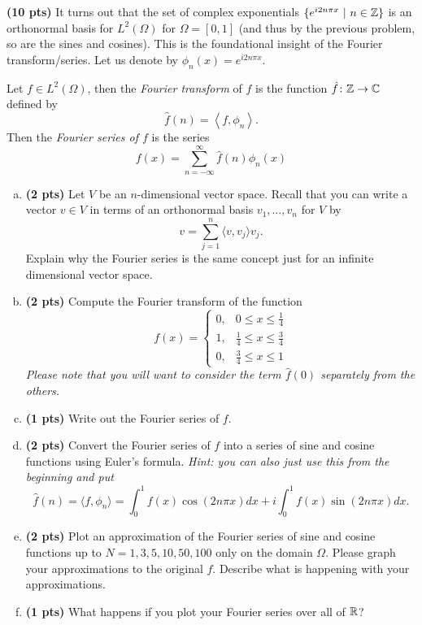 \documentclass[12pt]{article} %
\newcommand{\innprod}[2]{\left\langle #1, #2\right\rangle}
\begin{document}
\begin{problem}
\textbf{(10 pts)} It turns out that the set of complex exponentials $\{e^{i2n\pi x} ~|~ n\in \mathbb{Z}\}$ is an orthonormal basis for $L^2(\Omega)$ for $\Omega = [0,1]$ (and thus by the previous problem, so are the sines and cosines). This is the foundational insight of the Fourier transform/series. Let us denote by $\phi_n(x) = e^{i2n\pi x}$.

Let $f \in L^2(\Omega)$, then the \emph{Fourier transform} of $f$ is the function $\hat{f} \colon \mathbb{Z} \to \mathbb{C}$ defined by
\[
\hat{f}(n) = \innprod{f}{\phi_n}.
\]
Then the \emph{Fourier series of $f$} is the series
\[
f(x) = \sum_{n=-\infty}^\infty \hat{f}(n) \phi_n(x)
\]
\begin{enumerate}[(a)]
\item \textbf{(2 pts)} Let $V$ be an $n$-dimensional vector space. Recall that you can write a vector $v \in V$ in terms of an orthonormal basis $v_1,\dots,v_n$ for $V$ by
\[
v = \sum_{j=1}^n \langle v,v_j\rangle v_j.
\]
Explain why the Fourier series is the same concept just for an infinite dimensional vector space.
\item \textbf{(2 pts)} Compute the Fourier transform of the function 
\[
f(x) = \begin{cases} 0, & 0\leq x \leq \frac{1}{4} \\
	1, &  \frac{1}{4} \leq x \leq \frac{3}{4} \\
 0, & \frac{3}{4}\leq x \leq 1 \end{cases}
\]
\emph{Please note that you will want to consider the term $\hat{f}(0)$ separately from the others.}
\item \textbf{(1 pts)} Write out the Fourier series of $f$. 
\item \textbf{(2 pts)} Convert the Fourier series of $f$ into a series of sine and cosine functions using Euler's formula. \emph{Hint: you can also just use this from the beginning and put}
\[
\hat{f}(n) = \langle f,\phi_n\rangle = \int_0^1 f(x)\cos(2n\pi x) dx + i \int_0^1 f(x)\sin(2n\pi x)dx.
\]
\item \textbf{(2 pts)} Plot an approximation of the Fourier series of sine and cosine functions up to $N=1,3,5,10,50,100$ only on the domain $\Omega$. Please graph your approximations to the original $f$. Describe what is happening with your approximations.
\item \textbf{(1 pts)} What happens if you plot your Fourier series over all of $\mathbb{R}$?
\end{enumerate}
\end{problem}
\end{document}
